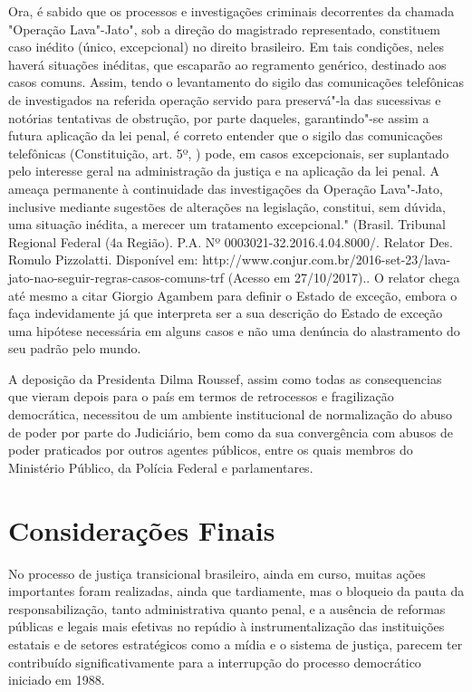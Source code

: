 {  Ora, é sabido que os processos e investigações criminais decorrentes
  da chamada "Operação Lava"-Jato", sob a direção do magistrado
  representado, constituem caso inédito (único, excepcional) no direito
  brasileiro. Em tais condições, neles haverá situações inéditas, que
  escaparão ao regramento genérico, destinado aos casos comuns. Assim,
  tendo o levantamento do sigilo das comunicações telefônicas de
  investigados na referida operação servido para preservá"-la das
  sucessivas e notórias tentativas de obstrução, por parte daqueles,
  garantindo"-se assim a futura aplicação da lei penal, é correto
  entender que o sigilo das comunicações telefônicas (Constituição, art.
  5º, ) pode, em casos excepcionais, ser suplantado pelo interesse
  geral na administração da justiça e na aplicação da lei penal. A
  ameaça permanente à continuidade das investigações da Operação
  Lava"-Jato, inclusive mediante sugestões de alterações na legislação,
  constitui, sem dúvida, uma situação inédita, a merecer um tratamento
  excepcional." (Brasil. Tribunal Regional Federal (4a Região). P.A.
    Nº 0003021-32.2016.4.04.8000/. Relator Des. Romulo
  Pizzolatti. Disponível em:
  http://www.conjur.com.br/2016-set-23/lava-jato-nao-seguir-regras-casos-comuns-trf
  (Acesso em 27/10/2017).}. O relator chega até mesmo a citar Giorgio
Agambem para definir o Estado de exceção, embora o faça indevidamente já
que interpreta ser a sua descrição do Estado de exceção uma hipótese
necessária em alguns casos e não uma denúncia do alastramento do seu
padrão pelo mundo.

A deposição da Presidenta Dilma Roussef, assim como todas as
consequencias que vieram depois para o país em termos de retrocessos e
fragilização democrática, necessitou de um ambiente institucional de
normalização do abuso de poder por parte do Judiciário, bem como da sua
convergência com abusos de poder praticados por outros agentes públicos,
entre os quais membros do Ministério Público, da Polícia Federal e
parlamentares.

\section{Considerações Finais}

No processo de justiça transicional brasileiro, ainda em curso, muitas
ações importantes foram realizadas, ainda que tardiamente, mas o
bloqueio da pauta da responsabilização, tanto administrativa quanto
penal, e a ausência de reformas públicas e legais mais efetivas no
repúdio à instrumentalização das instituições estatais e de setores
estratégicos como a mídia e o sistema de justiça, parecem ter
contribuído significativamente para a interrupção do processo
democrático iniciado em 1988.

